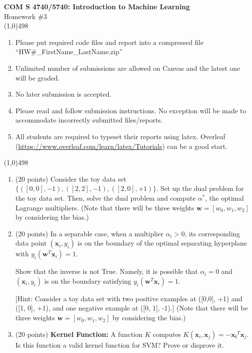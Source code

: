 \documentclass[11pt]{article}
\begin{document}
\begin{center}
{\Large \textbf{COM S 4740/5740: Introduction to Machine Learning}\\Homework \#3}\\

\linethickness{1mm}\line(1,0){498}

\begin{enumerate}
\item Please put required code files and report into a
compressed file ``HW\#\_FirstName\_LastName.zip''
\item Unlimited number of submissions are
allowed on Canvas and the latest one will be graded.
\item {\color{red} No later submission is accepted.}
\item Please read and follow submission instructions. No exception
will be made to accommodate incorrectly submitted files/reports.
\item All students are required to typeset their reports using
latex. Overleaf
(\url{https://www.overleaf.com/learn/latex/Tutorials}) can be a
good start.
\end{enumerate}

\linethickness{1mm}\line(1,0){498}

\end{center}




\begin{enumerate}

\item (20 points) Consider the toy data set $\{([0, 0], -1),
([2, 2], -1), ([2, 0], +1)\}$. Set up the dual problem for
the toy data set. Then, solve the dual problem and compute
$\alpha^*$, the optimal Lagrange multipliers. (Note that there will
be three weights $\boldsymbol w = [w_0, w_1, w_2]$ by considering
the bias.)

\item (20 points) In a separable case, when a multiplier
$\alpha_i > 0$, its corresponding data point $(\boldsymbol x_i,
y_i)$ is on the boundary of the optimal separating hyperplane
with $y_i(\boldsymbol w^T \boldsymbol x_i) = 1$.

Show that the inverse is not True. Namely, it is possible that
$\alpha_i = 0$ and $(\boldsymbol x_i, y_i)$ is on the boundary
satisfying $y_i(\boldsymbol w^T \boldsymbol x_i) = 1$.

[Hint: Consider a toy data set with two positive examples at
([0,0], +1) and ([1, 0], +1), and one negative example at ([0,
1], -1).] (Note that there will be three weights $\boldsymbol w =
[w_0, w_1, w_2]$ by considering the bias.)

\item (20 points) \textbf{Kernel Function:} A function $K$
computes $K(\boldsymbol x_i, \boldsymbol x_j) =
-\boldsymbol{x_i}^T \boldsymbol x_j $. Is this function a valid
kernel function for SVM? Prove or disprove it.

\end{enumerate}
\end{document}
